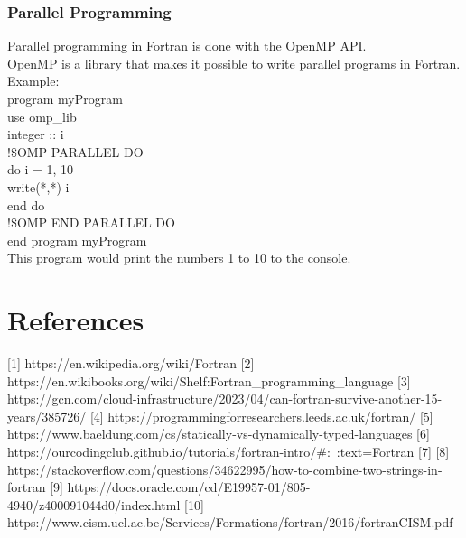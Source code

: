\documentclass[12pt,a4paper]{scrartcl}
\begin{document}
\subsubsection{Parallel Programming}
Parallel programming in Fortran is done with the OpenMP API.\\
OpenMP is a library that makes it possible to write parallel programs in Fortran.\\
Example:\\
program myProgram\\
use omp\_lib\\
integer :: i\\
!\$OMP PARALLEL DO\\
do i = 1, 10\\
write(*,*) i\\
end do\\
!\$OMP END PARALLEL DO\\
end program myProgram\\
This program would print the numbers 1 to 10 to the console.\\


\section{References}
[1] https://en.wikipedia.org/wiki/Fortran
[2] https://en.wikibooks.org/wiki/Shelf:Fortran_programming_language
[3] https://gcn.com/cloud-infrastructure/2023/04/can-fortran-survive-another-15-years/385726/
[4] https://programmingforresearchers.leeds.ac.uk/fortran/
[5] https://www.baeldung.com/cs/statically-vs-dynamically-typed-languages
[6] https://ourcodingclub.github.io/tutorials/fortran-intro/#:~:text=Fortran%
[7]
[8] https://stackoverflow.com/questions/34622995/how-to-combine-two-strings-in-fortran
[9] https://docs.oracle.com/cd/E19957-01/805-4940/z400091044d0/index.html
[10] https://www.cism.ucl.ac.be/Services/Formations/fortran/2016/fortranCISM.pdf
\end{document}
